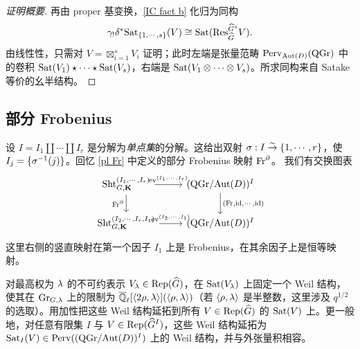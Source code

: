 \begin{proof}[证明概要]
再由 proper 基变换，\eqref{IC fact b} 化归为同构
\begin{equation*}
\gamma_{!}\delta^{*}\mathrm{Sat}_{\{1,\cdots , s\}}(V)\cong \mathrm{Sat}(\textup{Res}^{\widehat{G}^{s}}_{\widehat{G}} V).
\end{equation*}
由线性性，只需对 $V=\boxtimes_{i=1}^{s} V_{i}$ 证明；此时左端是张量范畴 $\textup{Perv}_{\textup{Aut}(D)}(\mathrm{QGr})$ 中的卷积 $\mathrm{Sat}(V_{1})\star\cdots\star\mathrm{Sat}(V_{s})$，右端是 $\mathrm{Sat}(V_{1}\otimes\cdots\otimes V_{s})$。所求同构来自 Satake 等价的幺半结构。
\end{proof}

\subsection{部分 Frobenius}\label{sss:pF}
设 $I=I_{1}\coprod\cdots\coprod I_{r}$ 是分解为\emph{单点集}的分解。这给出双射 $\sigma: I\stackrel{\sim}{\to} \{1,\cdots, r\}$，使 $I_{j}=\{\sigma^{-1}(j)\}$。回忆 \eqref{pl Fr} 中定义的部分 Frobenius 映射 $\textup{Fr}^{\partial}$。
我们有交换图表
\begin{equation}\label{pl Frob ev}
\begin{tikzcd}
\Sht^{(I_{1},\cdots, I_{r})}_{G,\bK} \arrow[r,"\ev^{(I_{1},\cdots, I_{r})}"] \arrow[d,"\Fr^{\pl}"'] & (\QGr/\Aut(D))^{I} \arrow[d,"{(\Fr, \id,\cdots, \id)}"] \\
\Sht^{(I_{2},\cdots, I_{r}, I_{1})}_{G,\bK} \arrow[r,"\ev^{(I_{2},\cdots, I_{1})}"] & (\QGr/\Aut(D))^{I}
\end{tikzcd}
\end{equation}
这里右侧的竖直映射在第一个因子 $I_{1}$ 上是 Frobenius，在其余因子上是恒等映射。

对最高权为 $\lambda$ 的不可约表示 $V_{\lambda}\in \textup{Rep}(\widehat{G})$，在 $\mathrm{Sat}(V_{\lambda})$ 上固定一个 Weil 结构，使其在 $\textup{Gr}_{G,\lambda}$ 上的限制为 $\overline{\mathbb{Q}}_\ell[\langle{2\rho, \lambda}\rangle](\langle{\rho,\lambda}\rangle)$（若 $\langle{\rho,\lambda}\rangle$ 是半整数，这里涉及 $q^{1/2}$ 的选取）。用加性把这些 Weil 结构延拓到所有 $V\in \textup{Rep}(\widehat{G})$ 的 $\mathrm{Sat}(V)$ 上。更一般地，对任意有限集 $I$ 与 $V\in \textup{Rep}(\widehat{G}^{I})$，这些 Weil 结构延拓为 $\mathrm{Sat}_{I}(V)\in \textup{Perv}((\mathrm{QGr}/\textup{Aut}(D))^{I})$ 上的 Weil 结构，并与外张量积相容。

